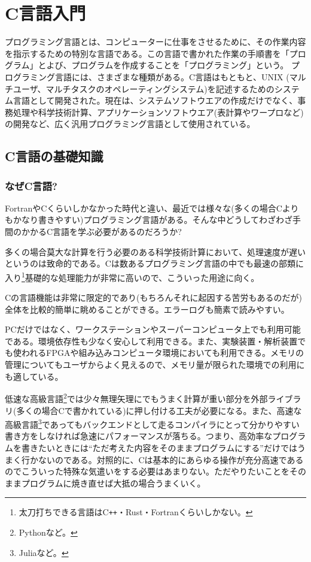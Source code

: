 \chapter{C言語入門}

\noindent
プログラミング言語とは、コンピューターに仕事をさせるために、その作業内容を指示するための特別な言語である。この言語で書かれた作業の手順書を「プログラム」とよび、プログラムを作成することを「プログラミング」という。
プログラミング言語には、さまざまな種類がある。C言語はもともと、UNIX (マルチユーザ、マルチタスクのオペレーティングシステム)を記述するためのシステム言語として開発された。現在は、システムソフトウエアの作成だけでなく、事務処理や科学技術計算、アプリケーションソフトウエア(表計算やワープロなど)の開発など、広く汎用プログラミング言語として使用されている。

\section{C言語の基礎知識}
\label{sec:C:basic}
\subsection{なぜC言語?}

FortranやCくらいしかなかった時代と違い、最近では様々な(多くの場合Cよりもかなり書きやすい)プログラミング言語がある。そんな中どうしてわざわざ手間のかかるC言語を学ぶ必要があるのだろうか?

多くの場合莫大な計算を行う必要のある科学技術計算において、処理速度が遅いというのは致命的である。Cは数あるプログラミング言語の中でも最速の部類に入り\footnote{太刀打ちできる言語はC\texttt{++}・Rust・Fortranくらいしかない。}基礎的な処理能力が非常に高いので、こういった用途に向く。

Cの言語機能は非常に限定的であり(もちろんそれに起因する苦労もあるのだが)全体を比較的簡単に眺めることができる。エラーログも簡素で読みやすい。

PCだけではなく、ワークステーションやスーパーコンピュータ上でも利用可能である。環境依存性も少なく安心して利用できる。また、実験装置・解析装置でも使われるFPGAや組み込みコンピュータ環境においても利用できる。メモリの管理についてもユーザからよく見えるので、メモリ量が限られた環境での利用にも適している。

低速な高級言語\footnote{Pythonなど。}では少々無理矢理にでもうまく計算が重い部分を外部ライブラリ(多くの場合Cで書かれている)に押し付ける工夫が必要になる。また、高速な高級言語\footnote{Juliaなど。}であってもバックエンドとして走るコンパイラにとって分かりやすい書き方をしなければ急速にパフォーマンスが落ちる。つまり、高効率なプログラムを書きたいときには``ただ考えた内容をそのままプログラムにする''だけではうまく行かないのである。対照的に、Cは基本的にあらゆる操作が充分高速であるのでこういった特殊な気遣いをする必要はあまりない。ただやりたいことをそのままプログラムに焼き直せば大抵の場合うまくいく。

